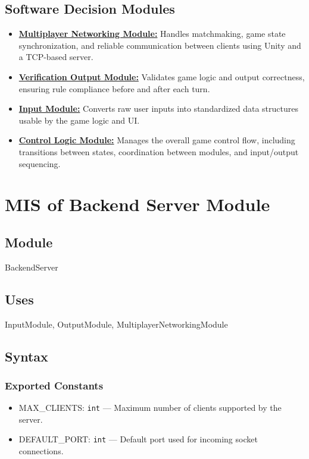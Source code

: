 \documentclass[12pt, titlepage]{article}
\begin{document}
\subsection{Software Decision Modules}

\begin{itemize}
\item \hyperref[MNM]{\textbf{Multiplayer Networking Module:}} Handles matchmaking, game state synchronization, and reliable communication between clients using Unity and a TCP-based server.
\item \hyperref[VOM]{\textbf{Verification Output Module:}} Validates game logic and output correctness, ensuring rule compliance before and after each turn.
\item \hyperref[IM]{\textbf{Input Module:}} Converts raw user inputs into standardized data structures usable by the game logic and UI.
\item \hyperref[CLM]{\textbf{Control Logic Module:}} Manages the overall game control flow, including transitions between states, coordination between modules, and input/output sequencing.
\end{itemize}

\newpage

\section{MIS of Backend Server Module}
\label{BSM}

\subsection{Module}
\hspace{1.5em}BackendServer

\subsection{Uses}
\hspace{1.5em}InputModule, OutputModule, MultiplayerNetworkingModule

\subsection{Syntax}

\subsubsection{Exported Constants}
\begin{itemize}
    \item MAX\_CLIENTS: \texttt{int} — Maximum number of clients supported by the server.
    \item DEFAULT\_PORT: \texttt{int} — Default port used for incoming socket connections.
\end{itemize}
\end{document}
